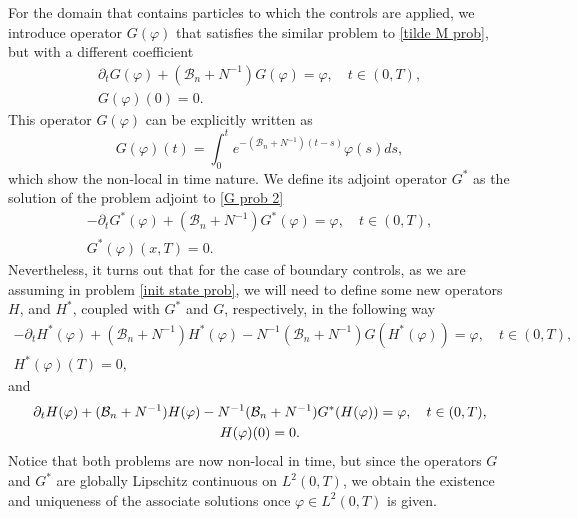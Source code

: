 \documentclass[reqno]{amsart}
\begin{document}
For the domain that contains particles to which the controls are applied, we
introduce operator $G(\varphi )$ that satisfies the similar problem to 
\eqref{tilde M prob}, but with a different coefficient
\begin{equation}
\begin{gathered}
\partial _{t}G(\varphi )+(\mathcal{B}_n+N^{-1})G(\varphi )=\varphi , \quad
t\in (0,T), \\
G(\varphi )(0)=0.
\end{gathered}  \label{G prob 2}
\end{equation}
This operator $G(\varphi )$ can be explicitly written as
\[
G(\varphi )(t)=\int _0^{t}e^{-(\mathcal{B}_n+N^{-1})(t-s)}\varphi
(s)ds,
\]
which show the non-local in time nature. We define its adjoint operator
$G^{\ast }$ as the solution of the problem adjoint to \eqref{G prob 2}
\begin{equation}
\begin{gathered}
-\partial _{t}G^{\ast }(\varphi )+(\mathcal{B}_n+N^{-1})G^{\ast }(\varphi
)=\varphi , \quad t\in (0,T), \\
G^{\ast }(\varphi )(x,T)=0.
\end{gathered} \label{adj G prob 2}
\end{equation}
Nevertheless, it turns out that for the case of boundary controls, as we are
assuming in problem \eqref{init state prob}, we will need to define some new
operators $H$, and $H^{\ast }$, coupled with $G^{\ast }$ and $G$,
respectively, in the following way
\begin{equation}
\begin{gathered}
-\partial _{t}H^{\ast }(\varphi )+(\mathcal{B}_n+N^{-1})H^{\ast }(\varphi
)-N^{-1}(\mathcal{B}_n+N^{-1})G(H^{\ast }(\varphi ))=\varphi , \quad t\in
(0,T), \\
H^{\ast }(\varphi )(T)=0,
\end{gathered}  \label{adj H prob 2}
\end{equation}
and
\begin{equation}
\begin{gathered}
\partial _{t}H(\varphi )+(\mathcal{B}_n+N^{-1})H(\varphi )-N^{-1}(\mathcal{%
B}_n+N^{-1})G^{\ast }(H(\varphi ))=\varphi , \quad t\in (0,T), \\
H(\varphi )(0)=0.
\end{gathered}  \label{H prob 2}
\end{equation}
Notice that both problems are now non-local in time, but since the operators
$G$ and $G^{\ast }$ are globally Lipschitz continuous on $L^2(0,T)$,
we obtain the existence and uniqueness of the associate solutions once
$\varphi \in L^2(0,T)$ is given.
\end{document}
